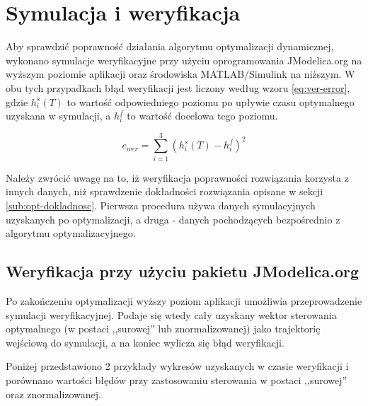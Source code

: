 \section{Symulacja i weryfikacja}
\label{sec:sym-wer}

Aby sprawdzić poprawność działania algorytmu optymalizacji dynamicznej, wykonano symulacje weryfikacyjne przy użyciu oprogramowania JModelica.org na wyższym poziomie aplikacji oraz środowiska MATLAB/Simulink na niższym.
W obu tych przypadkach błąd weryfikacji jest liczony według wzoru \ref{eq:ver-error}, gdzie $h_{i}^{s}(T)$ to wartość odpowiedniego poziomu po upływie czasu optymalnego uzyskana w symulacji, a $h_{i}^{f}$ to wartość docelowa tego poziomu.

\begin{equation}\label{eq:ver-error}
e_{wer} = \sum_{i=1}^{3} (h_{i}^{s}(T) - h_{i}^{f})^{2}
\end{equation}

Należy zwrócić uwagę na to, iż weryfikacja poprawności rozwiązania korzysta z innych danych, niż sprawdzenie dokładności rozwiązania opisane w sekcji \ref{sub:opt-dokladnosc}. Pierwsza procedura używa danych symulacyjnych uzyskanych po optymalizacji, a druga - danych pochodzących bezpośrednio z algorytmu optymalizacyjnego.

\subsection{Weryfikacja przy użyciu pakietu JModelica.org}
\label{sub:sym-wer-jmodelica}

Po zakończeniu optymalizacji wyższy poziom aplikacji umożliwia przeprowadzenie symulacji weryfikacyjnej. Podaje się wtedy cały uzyskany wektor sterowania optymalnego (w postaci ,,surowej'' lub znormalizowanej) jako trajektorię wejściową do symulacji, a na koniec wylicza się błąd weryfikacji.

Poniżej przedstawiono 2 przykłady wykresów uzyskanych w czasie weryfikacji i porównano wartości błędów przy zastosowaniu sterowania w postaci ,,surowej'' oraz znormalizowanej.

